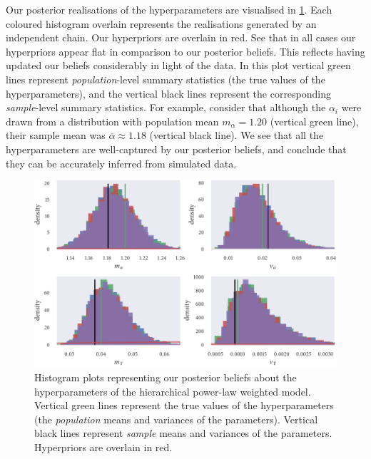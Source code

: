 Our posterior realisations of the hyperparameters are visualised in
\cref{fig:power_hier_hist}. Each coloured histogram overlain represents the
realisations generated by an independent chain. Our hyperpriors are overlain in
red. See that in all cases our hyperpriors appear flat in comparison to our
posterior beliefs. This reflects having updated our beliefs considerably in
light of the data.  In this plot vertical green lines represent
\emph{population}-level summary statistics (the true values of the
hyperparameters), and the vertical black lines represent the corresponding
\emph{sample}-level summary statistics. For example, consider that although the
$\alpha_i$ were drawn from a distribution with population mean
$m_{\alpha}=1.20$ (vertical green line), their sample mean was
$\overline{\alpha}\approx1.18$ (vertical black line).  We see that all the
hyperparameters are well-captured by our posterior beliefs, and conclude that
they can be accurately inferred from simulated data.

\begin{figure}[tbp]
  \includegraphics{power_hier_hist.pdf}
  \caption{Histogram plots representing our posterior beliefs about the
    hyperparameters of the hierarchical power-law weighted model. Vertical
    green lines represent the true values of the hyperparameters (the
    \emph{population} means and variances of the parameters). Vertical black
    lines represent \emph{sample} means and variances of the parameters.
    Hyperpriors are overlain in red.}
  \label{fig:power_hier_hist}
\end{figure}

